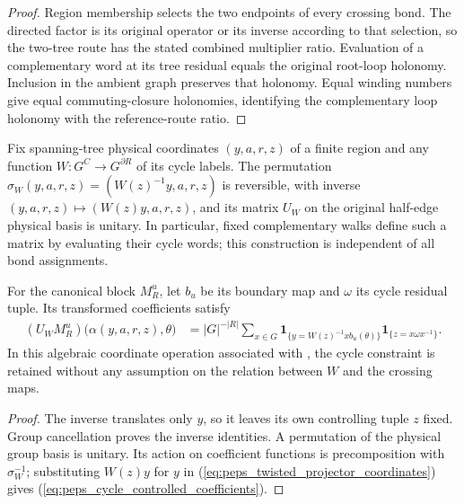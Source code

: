 \begin{proof}\leanok
    Region membership selects the two endpoints of every crossing bond.
    The directed factor is its original operator or its inverse according
    to that selection, so the two-tree route has the stated
    combined multiplier ratio. Evaluation of a complementary word at
    its tree residual equals the original root-loop holonomy.
    Inclusion in the ambient graph preserves that holonomy. Equal winding
    numbers give equal commuting-closure holonomies, identifying the
    complementary loop holonomy with the reference-route ratio.
\end{proof}

\begin{lemma}%
    \label{thm:peps_cycle_controlled_boundary}
    \leanok
    Fix spanning-tree physical coordinates $(y,a,r,z)$ of a finite
    region and any function $W:G^C\to G^{\partial R}$ of its cycle
    labels. The permutation
    $\sigma_W(y,a,r,z)=(W(z)^{-1}y,a,r,z)$ is reversible, with inverse
    $(y,a,r,z)\mapsto(W(z)y,a,r,z)$, and its matrix $U_W$ on the
    original half-edge physical basis is unitary. In particular, fixed
    complementary walks define such a matrix by evaluating their
    cycle words; this construction is independent of all bond assignments.

    For the canonical block $M_R^u$, let $b_u$ be its boundary
    map and $\omega$ its cycle residual tuple. Its transformed
    coefficients satisfy
    \begin{align}
        (U_WM_R^u)\bigl(\alpha(y,a,r,z),\theta\bigr)
         & =|G|^{-|R|}\sum_{x\in G}
        \mathbf 1_{\{y=W(z)^{-1}x b_u(\theta)\}}
        \mathbf 1_{\{z=x\omega x^{-1}\}}.
        \label{eq:peps_cycle_controlled_coefficients}
    \end{align}
    In this algebraic coordinate operation associated with
    \cite[\S6.3]{Schuch2010PEPS}, the cycle constraint is retained without any assumption on the
    relation between $W$ and the crossing maps.
\end{lemma}
\begin{proof}\leanok
    The inverse translates only $y$, so it leaves its own controlling
    tuple $z$ fixed. Group cancellation proves the inverse identities.
    A permutation of the physical group basis is unitary. Its action
    on coefficient functions is precomposition with $\sigma_W^{-1}$;
    substituting $W(z)y$ for $y$ in
    (\ref{eq:peps_twisted_projector_coordinates}) gives
    (\ref{eq:peps_cycle_controlled_coefficients}).
\end{proof}

